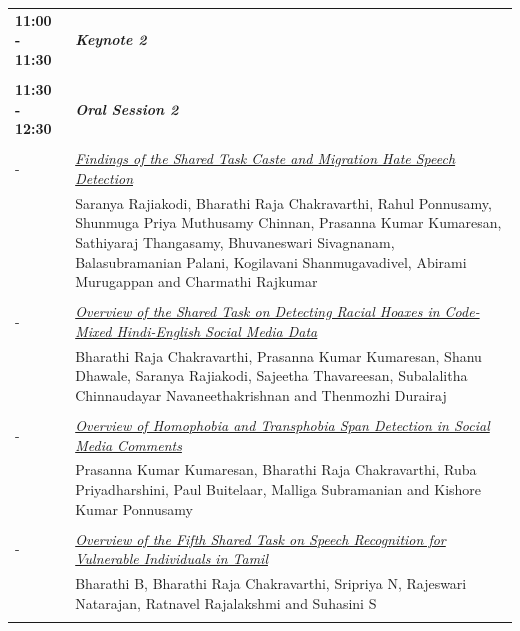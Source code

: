 \documentclass[11pt,oneside]{book}
\begin{document}
\begin{tabular}{p{24mm}p{124mm}}
                      \textbf{11:00 - 11:30} & \emph{\textbf{Keynote 2}}\\\\
      
                      \textbf{11:30 - 12:30} & \emph{\textbf{Oral Session 2}}\\\\
      
                
                       -  & \hyperlink{page.214}{\emph{Findings of the Shared Task Caste and Migration Hate Speech Detection}}\\
        & Saranya Rajiakodi\index{Rajiakodi}, Bharathi Raja Chakravarthi\index{Chakravarthi}, Rahul Ponnusamy\index{Ponnusamy}, Shunmuga Priya Muthusamy Chinnan\index{Chinnan}, Prasanna Kumar Kumaresan\index{Kumaresan}, Sathiyaraj Thangasamy\index{Thangasamy}, Bhuvaneswari Sivagnanam\index{Sivagnanam}, Balasubramanian Palani\index{Palani}, Kogilavani Shanmugavadivel\index{Shanmugavadivel}, Abirami Murugappan\index{Murugappan} and Charmathi Rajkumar\index{Rajkumar}\\\\
                
                       -  & \hyperlink{page.221}{\emph{Overview of the Shared Task on Detecting Racial Hoaxes in Code-Mixed Hindi-English Social Media Data}}\\
        & Bharathi Raja Chakravarthi\index{Chakravarthi}, Prasanna Kumar Kumaresan\index{Kumaresan}, Shanu Dhawale\index{Dhawale}, Saranya Rajiakodi\index{Rajiakodi}, Sajeetha Thavareesan\index{Thavareesan}, Subalalitha Chinnaudayar Navaneethakrishnan\index{Navaneethakrishnan} and Thenmozhi Durairaj\index{Durairaj}\\\\
                
                       -  & \hyperlink{page.228}{\emph{Overview of Homophobia and Transphobia Span Detection in Social Media Comments}}\\
        & Prasanna Kumar Kumaresan\index{Kumaresan}, Bharathi Raja Chakravarthi\index{Chakravarthi}, Ruba Priyadharshini\index{Priyadharshini}, Paul Buitelaar\index{Buitelaar}, Malliga Subramanian\index{Subramanian} and Kishore Kumar Ponnusamy\index{Ponnusamy}\\\\
                
                       -  & \hyperlink{page.234}{\emph{Overview of the Fifth Shared Task on Speech Recognition for Vulnerable Individuals in Tamil}}\\
        & Bharathi B\index{B}, Bharathi Raja Chakravarthi\index{Chakravarthi}, Sripriya N\index{N}, Rajeswari Natarajan\index{Natarajan}, Ratnavel Rajalakshmi\index{Rajalakshmi} and Suhasini S\index{S}\\\\
              \end{tabular}
\end{document}
